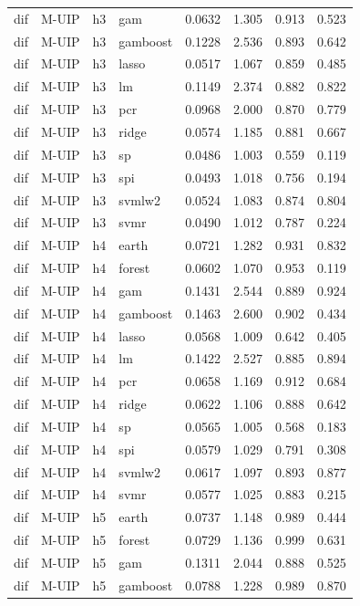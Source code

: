 \begin{ThreePartTable}
\begin{longtable}[t]{llclcccc}
dif & M-UIP & h3 & gam & 0.0632 & 1.305 & 0.913 & 0.523\\
dif & M-UIP & h3 & gamboost & 0.1228 & 2.536 & 0.893 & 0.642\\
dif & M-UIP & h3 & lasso & 0.0517 & 1.067 & 0.859 & 0.485\\
dif & M-UIP & h3 & lm & 0.1149 & 2.374 & 0.882 & 0.822\\
dif & M-UIP & h3 & pcr & 0.0968 & 2.000 & 0.870 & 0.779\\
dif & M-UIP & h3 & ridge & 0.0574 & 1.185 & 0.881 & 0.667\\
dif & M-UIP & h3 & sp & 0.0486 & 1.003 & 0.559 & 0.119\\
dif & M-UIP & h3 & spi & 0.0493 & 1.018 & 0.756 & 0.194\\
dif & M-UIP & h3 & svmlw2 & 0.0524 & 1.083 & 0.874 & 0.804\\
dif & M-UIP & h3 & svmr & 0.0490 & 1.012 & 0.787 & 0.224\\
\addlinespace
dif & M-UIP & h4 & earth & 0.0721 & 1.282 & 0.931 & 0.832\\
dif & M-UIP & h4 & forest & 0.0602 & 1.070 & 0.953 & 0.119\\
dif & M-UIP & h4 & gam & 0.1431 & 2.544 & 0.889 & 0.924\\
dif & M-UIP & h4 & gamboost & 0.1463 & 2.600 & 0.902 & 0.434\\
dif & M-UIP & h4 & lasso & 0.0568 & 1.009 & 0.642 & 0.405\\
dif & M-UIP & h4 & lm & 0.1422 & 2.527 & 0.885 & 0.894\\
dif & M-UIP & h4 & pcr & 0.0658 & 1.169 & 0.912 & 0.684\\
dif & M-UIP & h4 & ridge & 0.0622 & 1.106 & 0.888 & 0.642\\
dif & M-UIP & h4 & sp & 0.0565 & 1.005 & 0.568 & 0.183\\
dif & M-UIP & h4 & spi & 0.0579 & 1.029 & 0.791 & 0.308\\
dif & M-UIP & h4 & svmlw2 & 0.0617 & 1.097 & 0.893 & 0.877\\
dif & M-UIP & h4 & svmr & 0.0577 & 1.025 & 0.883 & 0.215\\
\addlinespace
dif & M-UIP & h5 & earth & 0.0737 & 1.148 & 0.989 & 0.444\\
dif & M-UIP & h5 & forest & 0.0729 & 1.136 & 0.999 & 0.631\\
dif & M-UIP & h5 & gam & 0.1311 & 2.044 & 0.888 & 0.525\\
dif & M-UIP & h5 & gamboost & 0.0788 & 1.228 & 0.989 & 0.870\\

\end{longtable}
\end{ThreePartTable}

